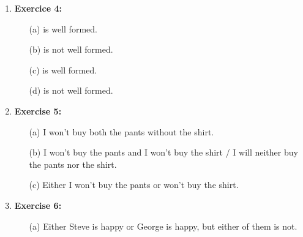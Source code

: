 \documentclass{article} %
\begin{document}
\begin{enumerate}
        \item \textbf{Exercice 4:}
        \begin{itemize}
            \item[(a)] is well formed.
            \item[(b)] is not well formed.
            \item[(c)] is well formed.
            \item[(d)] is not well formed.
        \end{itemize}

        \item \textbf{Exercise 5:}
        \begin{itemize}
            \item[(a)] I won't buy both the pants without the shirt.
            \item[(b)] I won't buy the pants and I won't buy the shirt / I will neither buy the pants nor the shirt.
            \item[(c)] Either I won't buy the pants or won't buy the shirt.
        \end{itemize}

        \item \textbf{Exercise 6:}
        \begin{itemize}
            \item[(a)] Either Steve is happy or George is happy, but either of them is not.
        \end{itemize}
    \end{enumerate}
\end{document}
